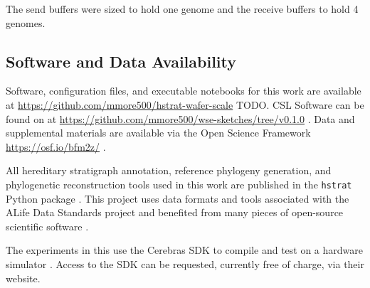 The send buffers were sized to hold one genome and the receive buffers to hold 4 genomes.


\subsection{Software and Data Availability}

Software, configuration files, and executable notebooks for this work are available at \url{https://github.com/mmore500/hstrat-wafer-scale} TODO.
CSL Software can be found on at \url{https://github.com/mmore500/wse-sketches/tree/v0.1.0} \citep{moreno2024wse}.
Data and supplemental materials are available via the Open Science Framework \url{https://osf.io/bfm2z/} \citep{foster2017open}.

All hereditary stratigraph annotation, reference phylogeny generation, and phylogenetic reconstruction tools used in this work are published in the \texttt{hstrat} Python package \citep{moreno2022hstrat}.
This project uses data formats and tools associated with the ALife Data Standards project \citep{lalejini2019data} and benefited from many pieces of open-source scientific software \citep{sand2014tqdist,2020SciPy-NMeth,harris2020array,reback2020pandas,mckinney-proc-scipy-2010,sukumaran2010dendropy,cock2009biopython,dolson2024phylotrackpy,torchiano2016effsize,waskom2021seaborn,hunter2007matplotlib,moreno2024apc,moreno2023teeplot,torchiano2016effsize,moreno2024pecking,moreno2024joinem,moreno2024hsurf}.

The experiments in this use the Cerebras SDK to compile and test on a hardware simulator \citep{TODOCITE}.
Access to the SDK can be requested, currently free of charge, via their website.
